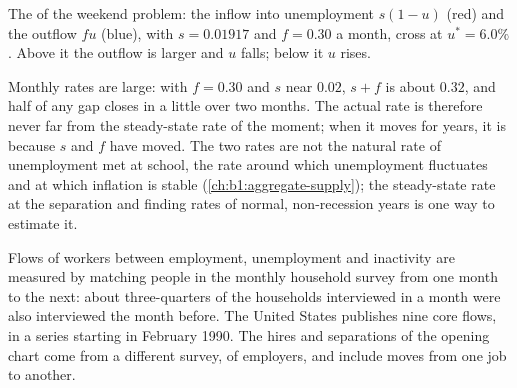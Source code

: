 \begin{omfigure}

{\small The  of the weekend problem: the inflow into
unemployment $s(1 - u)$ (red) and the outflow $fu$ (blue), with $s = 0.01917$ and
$f = 0.30$ a month, cross at $u^* = 6.0\%$. Above it the outflow is larger and $u$
falls; below it $u$ rises.}
\end{omfigure}

Monthly rates are large: with $f = 0.30$ and $s$ near $0.02$, $s + f$ is about $0.32$,
and half of any gap closes in a little over two months. The actual rate is
therefore never far from the steady-state rate of the moment; when it moves
for years, it is because $s$ and $f$ have moved. The two rates are not the
natural rate of unemployment met at school, the rate around which
unemployment fluctuates and at which inflation is stable
(\cref{ch:b1:aggregate-supply}); the steady-state rate at the separation
and finding rates of normal, non-recession years is one way to estimate it.

\begin{measure}
Flows of workers between employment, unemployment and inactivity are
measured by matching people in the monthly household survey from one
month to the next: about three-quarters of the households interviewed in a
month were also interviewed the month before. The United States publishes
nine core flows, in a series starting in February 1990. %
The hires and separations of the opening chart come from a different
survey, of employers, and include moves from one job to another.
\end{measure}

